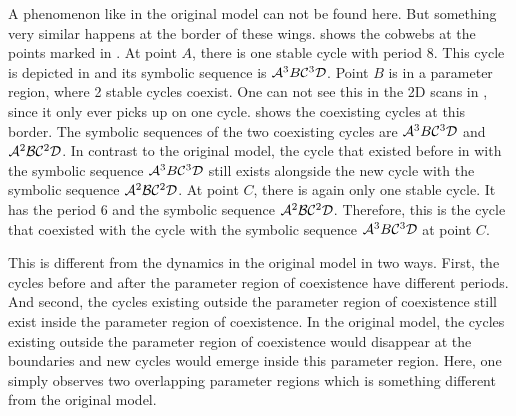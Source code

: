 A phenomenon like in the original model can not be found here.
But something very similar happens at the border of these wings.
 shows the cobwebs at the points marked in .
At point $A$, there is one stable cycle with period $8$.
This cycle is depicted in  and its symbolic sequence is $\mathcal{A}^3B\mathcal{C}^3\mathcal{D}$.
Point $B$ is in a parameter region, where 2 stable cycles coexist.
One can not see this in the 2D scans in , since it only ever picks up on one cycle.
 shows the coexisting cycles at this border.
The symbolic sequences of the two coexisting cycles are $\mathcal{A}^3B\mathcal{C}^3\mathcal{D}$ and $\mathcal{A}^2\mathcal{B}\mathcal{C}^2\mathcal{D}$.
In contrast to the original model, the cycle that existed before in  with the symbolic sequence $\mathcal{A}^3B\mathcal{C}^3\mathcal{D}$ still exists alongside the new cycle with the symbolic sequence $\mathcal{A}^2\mathcal{B}\mathcal{C}^2\mathcal{D}$.
At point $C$, there is again only one stable cycle.
It has the period $6$ and the symbolic sequence $\mathcal{A}^2\mathcal{B}\mathcal{C}^2\mathcal{D}$.
Therefore, this is the cycle that coexisted with the cycle with the symbolic sequence $\mathcal{A}^3B\mathcal{C}^3\mathcal{D}$ at point $C$.

This is different from the dynamics in the original model in two ways.
First, the cycles before and after the parameter region of coexistence have different periods.
And second, the cycles existing outside the parameter region of coexistence still exist inside the parameter region of coexistence.
In the original model, the cycles existing outside the parameter region of coexistence would disappear at the boundaries and new cycles would emerge inside this parameter region.
Here, one simply observes two overlapping parameter regions which is something different from the original model.
